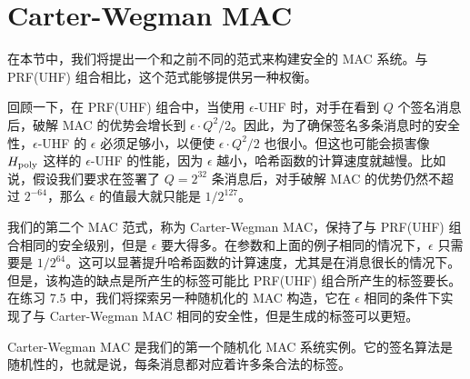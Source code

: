 \section{Carter-Wegman MAC}\label{sec:7-4}

在本节中，我们将提出一个和之前不同的范式来构建安全的 MAC 系统。与 PRF(UHF) 组合相比，这个范式能够提供另一种权衡。

回顾一下，在 PRF(UHF) 组合中，当使用 $\epsilon$-UHF 时，对手在看到 $Q$ 个签名消息后，破解 MAC 的优势会增长到 $\epsilon\cdot{Q^2}/{2}$。因此，为了确保签名多条消息时的安全性，$\epsilon$-UHF 的 $\epsilon$ 必须足够小，以便使 $\epsilon\cdot{Q^2}/{2}$ 也很小。但这也可能会损害像 $H_{\rm poly}$ 这样的 $\epsilon$-UHF 的性能，因为 $\epsilon$ 越小，哈希函数的计算速度就越慢。比如说，假设我们要求在签署了 $Q=2^{32}$ 条消息后，对手破解 MAC 的优势仍然不超过 $2^{-64}$，那么 $\epsilon$ 的值最大就只能是 ${1}/{2^{127}}$。

我们的第二个 MAC 范式，称为 Carter-Wegman MAC，保持了与 PRF(UHF) 组合相同的安全级别，但是 $\epsilon$ 要大得多。在参数和上面的例子相同的情况下，$\epsilon$ 只需要是 ${1}/{2^{64}}$。这可以显著提升哈希函数的计算速度，尤其是在消息很长的情况下。但是，该构造的缺点是所产生的标签可能比 PRF(UHF) 组合所产生的标签要长。在练习 7.5 中，我们将探索另一种随机化的 MAC 构造，它在 $\epsilon$ 相同的条件下实现了与 Carter-Wegman MAC 相同的安全性，但是生成的标签可以更短。

Carter-Wegman MAC 是我们的第一个随机化 MAC 系统实例。它的签名算法是随机性的，也就是说，每条消息都对应着许多条合法的标签。

\vspace{5pt}

